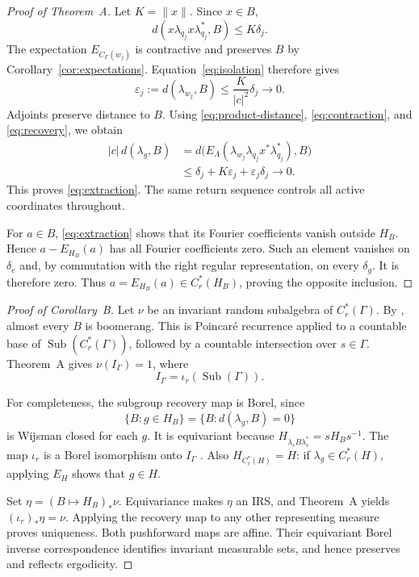 \documentclass[11pt,letterpaper]{amsart}
\numberwithin{equation}{section}
\theoremstyle{definition}
\theoremstyle{remark}
\newcommand{\Cr}{C_r^*}
\newcommand{\Sub}{\operatorname{Sub}}
\begin{document}
\begin{proof}[Proof of Theorem~A]
Let $K=\|x\|$. Since $x\in B$,
\[
 d(x\lambda_{q_j}x\lambda_{q_j}^*,B)\le K\delta_j.
\]
The expectation $E_{C_\Gamma(w_j)}$ is contractive and preserves $B$
by Corollary~\ref{cor:expectations}. Equation~\eqref{eq:isolation}
therefore gives
\begin{equation}\label{eq:approximate-unitary}
 \varepsilon_j:=d(\lambda_{w_j},B)
 \le\frac{K}{|c|^2}\delta_j\longrightarrow0.
\end{equation}
Adjoints preserve distance to $B$. Using
\eqref{eq:product-distance}, \eqref{eq:contraction}, and
\eqref{eq:recovery}, we obtain
\[
 \begin{aligned}
 |c|\,d(\lambda_g,B)
 &=d\bigl(E_\Lambda(
       \lambda_{w_j}\lambda_{q_j}x^*\lambda_{q_j}^*),B\bigr)\\
 &\le\delta_j+K\varepsilon_j+\varepsilon_j\delta_j
 \longrightarrow0.
 \end{aligned}
\]
This proves \eqref{eq:extraction}.
The same return sequence controls all active coordinates throughout.

For $a\in B$, \eqref{eq:extraction} shows that its Fourier coefficients
vanish outside $H_B$. Hence $a-E_{H_B}(a)$ has all Fourier coefficients
zero. Such an element vanishes on $\delta_e$ and, by commutation with
the right regular representation, on every $\delta_g$.
It is therefore zero. Thus $a=E_{H_B}(a)\in\Cr(H_B)$, proving the
opposite inclusion.
\end{proof}

\begin{proof}[Proof of Corollary~B]
Let $\nu$ be an invariant random subalgebra of $\Cr(\Gamma)$.
By \cite[Proposition~6.3]{FOT}, almost every $B$ is boomerang.
This is Poincar\'e recurrence applied to a countable base of
$\Sub(\Cr(\Gamma))$, followed by a countable intersection over
$s\in\Gamma$. Theorem~A gives $\nu(I_\Gamma)=1$, where
\[
 I_\Gamma=\iota_r(\Sub(\Gamma)).
\]

For completeness, the subgroup recovery map is Borel, since
\[
 \{B:g\in H_B\}=\{B:d(\lambda_g,B)=0\}
\]
is Wijsman closed for each $g$.
It is equivariant because
$H_{\lambda_sB\lambda_s^*}=sH_Bs^{-1}$.
The map $\iota_r$ is a Borel isomorphism onto $I_\Gamma$
\cite[Theorem~2.13]{FOT}. Also $H_{\Cr(H)}=H$:
if $\lambda_g\in\Cr(H)$, applying $E_H$ shows that $g\in H$.

Set $\eta=(B\mapsto H_B)_*\nu$.
Equivariance makes $\eta$ an IRS, and Theorem~A yields
$(\iota_r)_*\eta=\nu$. Applying the recovery map to any other
representing measure proves uniqueness. Both pushforward maps are
affine. Their equivariant Borel inverse correspondence identifies
invariant measurable sets, and hence preserves and reflects
ergodicity.
\end{proof}
\end{document}
